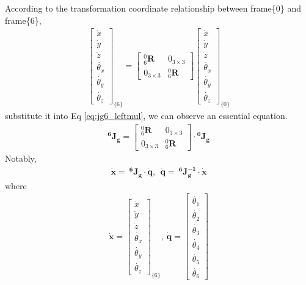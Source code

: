 According to the transformation coordinate relationship between frame\{0\} and frame\{6\},
\begin{equation}
\begin{split}
\begin{bmatrix}
\dot{x}\\ 
\dot{y}\\ 
\dot{z}\\ 
\dot{\theta_x}\\ 
\dot{\theta_y}\\
\dot{\theta_z} 
\end{bmatrix}_{\!\{6\}}
=
\begin{bmatrix}
^0_6\mathbf{R} & 0_{ 3\times 3} \\ 
0_{ 3\times 3} & ^0_6\mathbf{R}
\end{bmatrix}
\begin{bmatrix}
\dot{x}\\ 
\dot{y}\\ 
\dot{z}\\ 
\dot{\theta_x}\\ 
\dot{\theta_y}\\
\dot{\theta_z} 
\end{bmatrix}_{\!\{0\}}
\end{split}
\end{equation}
substitute it into Eq \ref{eq:jg6_leftmul}, we can observe an essential equation.
\begin{equation}
\begin{split}
\mathbf{^6\!J_g}
= 
\begin{bmatrix}
^0_6\mathbf{R} & 0_{ 3\times 3} \\ 
0_{ 3\times 3} & ^0_6\mathbf{R}
\end{bmatrix}
\cdot
\mathbf{^0\!J_g}
\end{split}
\end{equation}
Notably,
\begin{equation}
\label{eq:jg6}
\begin{split}
\boldsymbol{\dot{x}} = \ \mathbf{^6\!J_g} \cdot \boldsymbol{\dot{q}}
,\ \ 
\boldsymbol{\dot{q}} = \ \mathbf{^6\!J_g^{-1}} \cdot \boldsymbol{\dot{x}}
\end{split}
\end{equation}
where
\begin{equation*}
\begin{split}
\boldsymbol{\dot{x}}
=
\begin{bmatrix}
\dot{x}\\
\dot{y}\\
\dot{z}\\
\dot{\theta _x}\\
\dot{\theta _y}\\
\dot{\theta _z}
\end{bmatrix}_{\!\{6\}}
,\ 
\boldsymbol{\dot{q}}
=
\begin{bmatrix}
\dot{\theta _1} \\ 
\dot{\theta _2} \\ 
\dot{\theta _3} \\ 
\dot{\theta _4} \\ 
\dot{\theta _5} \\ 
\dot{\theta _6} 
\end{bmatrix}
\end{split}
\end{equation*}
